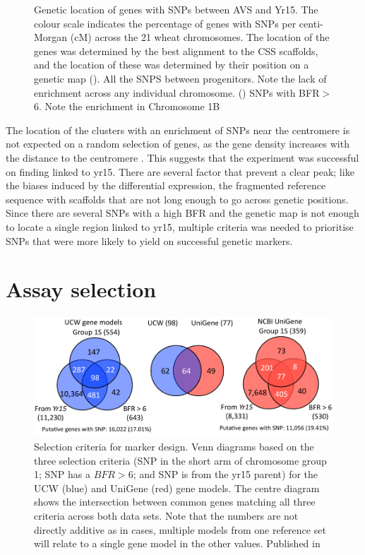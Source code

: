 \begin{figure}
\begin{subfigure}{0.45\textwidth}
	\end{subfigure}
	\caption{Genetic location of genes with SNPs between AVS and Yr15. The colour scale indicates the percentage of genes with SNPs per centi-Morgan (cM) across the 21 wheat chromosomes. The location of the genes was determined by the best alignment to the CSS scaffolds, and the location of these was determined by their position on a genetic map \citep{Wang2014} (). All the SNPS between progenitors. Note the lack of enrichment across any individual chromosome. () SNPs with BFR$>$6. Note the enrichment in Chromosome 1B }
	\label{fig:yr15:bfrs:0-6}
\end{figure}

The location of the clusters with an enrichment of SNPs near the centromere is not expected on a random selection of genes, as the gene density increases with the distance to the centromere \citep{Akhunov2003}. 
This suggests that the experiment was successful on finding  linked to \acrshort{yr15}. 
There are several factor that prevent a clear peak; like the biases induced by the differential expression, the fragmented reference sequence with scaffolds that are not long enough to go across genetic positions. 
Since there are several SNPs with a high BFR and the genetic map is not enough to locate a single region linked to \acrshort{yr15},  multiple criteria was needed to prioritise SNPs that were more likely to yield on successful genetic markers.

\section{Assay selection} 

\begin{figure}
\centering
\includegraphics[width=1\textwidth]{Yr15/Figures/selection/snpSets.pdf}
\caption{Selection criteria for marker design. Venn diagrams based on the three selection criteria (SNP in the short arm of chromosome group 1; SNP has a $BFR>6$; and SNP is from the \acrshort{yr15} parent) for the UCW (blue) and UniGene (red) gene models. The centre diagram shows the intersection between common genes matching all three criteria across both data sets. Note that the numbers are not directly additive as in cases, multiple models from one reference set will relate to a single gene model in the other values. Published in \citep{Ramirez-Gonzalez2015b} }
\label{fig:yr15:snpset}
\end{figure}


